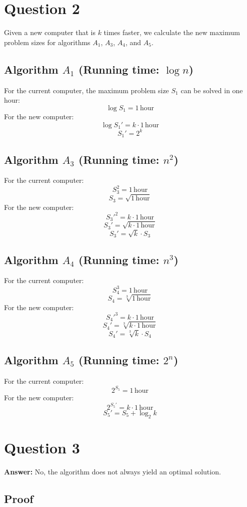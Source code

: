 \documentclass{article}
\begin{document}
\section{Question 2}
Given a new computer that is \(k\) times faster, we calculate the new maximum problem sizes for algorithms \(A_1\), \(A_3\), \(A_4\), and \(A_5\).

\subsection*{Algorithm \(A_1\) (Running time: \( \log n \))}
For the current computer, the maximum problem size \(S_1\) can be solved in one hour:
\[ \log S_1 = 1 \, \text{hour} \]
For the new computer:
\[ \log S_1' = k \cdot 1 \, \text{hour} \]
\[ S_1' = 2^{k} \]

\subsection*{Algorithm \(A_3\) (Running time: \( n^2 \))}
For the current computer:
\[ S_3^2 = 1 \, \text{hour} \]
\[ S_3 = \sqrt{1 \, \text{hour}} \]
For the new computer:
\[ S_3'^2 = k \cdot 1 \, \text{hour} \]
\[ S_3' = \sqrt{k \cdot 1 \, \text{hour}} \]
\[ S_3' = \sqrt{k} \cdot S_3 \]

\subsection*{Algorithm \(A_4\) (Running time: \( n^3 \))}
For the current computer:
\[ S_4^3 = 1 \, \text{hour} \]
\[ S_4 = \sqrt[3]{1 \, \text{hour}} \]
For the new computer:
\[ S_4'^3 = k \cdot 1 \, \text{hour} \]
\[ S_4' = \sqrt[3]{k \cdot 1 \, \text{hour}} \]
\[ S_4' = \sqrt[3]{k} \cdot S_4 \]

\subsection*{Algorithm \(A_5\) (Running time: \( 2^n \))}
For the current computer:
\[ 2^{S_5} = 1 \, \text{hour} \]
For the new computer:
\[ 2^{S_5'} = k \cdot 1 \, \text{hour} \]
\[ S_5' = S_5 + \log_2{k} \]
\section{Question 3}
\textbf{Answer:} No, the algorithm does not always yield an optimal solution.

\subsection*{Proof}
\end{document}
